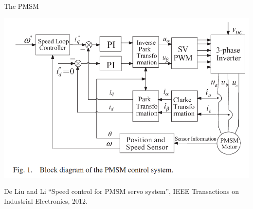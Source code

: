 \documentclass[presentation,aspectratio=1610]{beamer}
\begin{document}
\begin{frame}[label={sec:org08ae0d8}]{The PMSM}
\begin{center}
\includegraphics[width=0.8\linewidth]{../../figures/pmsm_control_block_diag.png}
\end{center}
{\footnotesize De Liu and Li  ``Speed control for PMSM servo system'', IEEE Transactions on Industrial Electronics, 2012.}
\end{frame}
\end{document}

